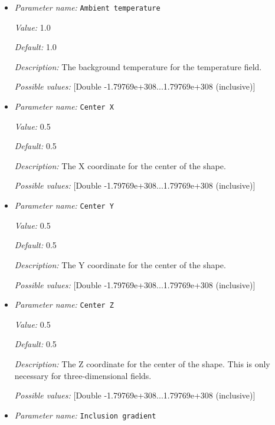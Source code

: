 \begin{itemize}
\item {\it Parameter name:} {\tt Ambient temperature}
\label{parameters:Initial conditions/Inclusion shape perturbation/Ambient temperature}


{\it Value:} 1.0


{\it Default:} 1.0


{\it Description:} The background temperature for the temperature field.


{\it Possible values:} [Double -1.79769e+308...1.79769e+308 (inclusive)]
\item {\it Parameter name:} {\tt Center X}
\label{parameters:Initial conditions/Inclusion shape perturbation/Center X}


{\it Value:} 0.5


{\it Default:} 0.5


{\it Description:} The X coordinate for the center of the shape.


{\it Possible values:} [Double -1.79769e+308...1.79769e+308 (inclusive)]
\item {\it Parameter name:} {\tt Center Y}
\label{parameters:Initial conditions/Inclusion shape perturbation/Center Y}


{\it Value:} 0.5


{\it Default:} 0.5


{\it Description:} The Y coordinate for the center of the shape.


{\it Possible values:} [Double -1.79769e+308...1.79769e+308 (inclusive)]
\item {\it Parameter name:} {\tt Center Z}
\label{parameters:Initial conditions/Inclusion shape perturbation/Center Z}


{\it Value:} 0.5


{\it Default:} 0.5


{\it Description:} The Z coordinate for the center of the shape. This is only necessary for three-dimensional fields.


{\it Possible values:} [Double -1.79769e+308...1.79769e+308 (inclusive)]
\item {\it Parameter name:} {\tt Inclusion gradient}
\label{parameters:Initial conditions/Inclusion shape perturbation/Inclusion gradient}



\end{itemize}
